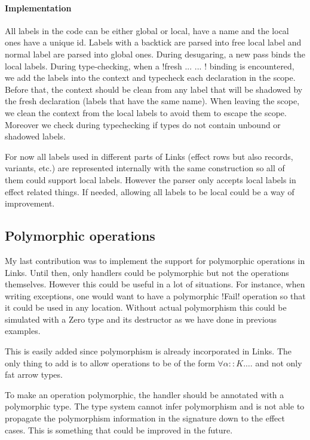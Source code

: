 \documentclass[11pt, nonacm=true, language=french, language=english]{acmart}
\begin{document}
\paragraph{Implementation}
All labels in the code can be either global or local, have a name and the local ones have a unique id. Labels with a backtick are parsed into free local label and normal label are parsed into global ones. During desugaring, a new pass binds the local labels. During type-checking, when a !fresh ... { ... }! binding is encountered, we add the labels into the context and typecheck each declaration in the scope. Before that, the context should be clean from any label that will be shadowed by the fresh declaration (labels that have the same name). When leaving the scope, we clean the context from the local labels to avoid them to escape the scope. Moreover we check during typechecking if types do not contain unbound or shadowed labels.

\begin{rem}
  For now all labels used in different parts of Links (effect rows but also records, variants, etc.) are represented internally with the same construction so all of them could support local labels. However the parser only accepts local labels in effect related things. If needed, allowing all labels to be local could be a way of improvement.
\end{rem}


\subsection{Polymorphic operations}
\label{sec:poly-op}

My last contribution was to implement the support for polymorphic operations in Links. Until then, only handlers could be polymorphic but not the operations themselves. However this could be useful in a lot of situations. For instance, when writing exceptions, one would want to have a polymorphic !Fail! operation so that it could be used in any location. Without actual polymorphism this could be simulated with a Zero type and its destructor as we have done in previous examples.

This is easily added since polymorphism is already incorporated in Links. The only thing to add is to allow operations to be of the form $\forall \alpha ::K. \dots$ and not only fat arrow types.

To make an operation polymorphic, the handler should be annotated with a polymorphic type. The type system cannot infer polymorphism and is not able to propagate the polymorphism information in the signature down to the effect cases. This is something that could be improved in the future.
\end{document}
